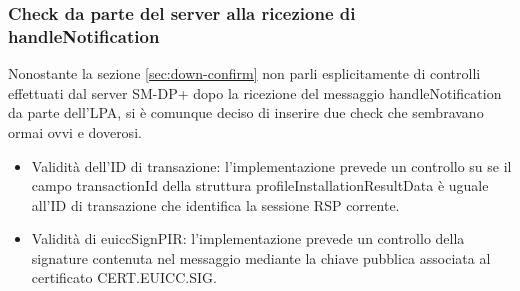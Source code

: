 \documentclass[10pt, oneside]{book}
\begin{document}
\subsubsection{Check da parte del server alla ricezione di handleNotification}
Nonostante la sezione \ref{sec:down-confirm} non parli esplicitamente di controlli effettuati dal server SM-DP+ dopo la ricezione del messaggio handleNotification da parte dell'LPA, si è comunque deciso di inserire due check che sembravano ormai ovvi e doverosi.
\begin{itemize}
\item Validità dell'ID di transazione: l'implementazione prevede un controllo su se il campo transactionId della struttura profileInstallationResultData è uguale all'ID di transazione che identifica la sessione RSP corrente.
\item Validità di euiccSignPIR: l'implementazione prevede un controllo della signature contenuta nel messaggio mediante la chiave pubblica associata al certificato CERT.EUICC.SIG.
\end{itemize}
\end{document}
